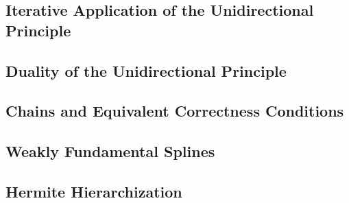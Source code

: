 \label{sec:45spatAdaptiveUP}

\blindtext{}



\subsection{Iterative Application of the Unidirectional Principle}
\label{sec:451iterativeUnidirectionalPrinciple}

\blindtext{}



\subsection{Duality of the Unidirectional Principle}
\label{sec:452duality}

\blindtext{}



\subsection{Chains and Equivalent Correctness Conditions}
\label{sec:453chains}

\blindtext{}



\subsection{Weakly Fundamental Splines}
\label{sec:454wfs}

\blindtext{}



\subsection{Hermite Hierarchization}
\label{sec:455hermiteHierarchization}

\blindtext{}
